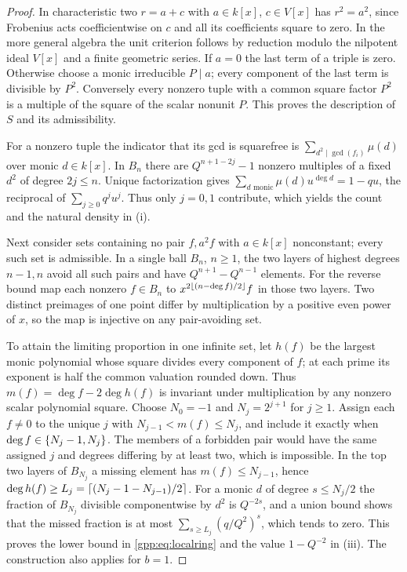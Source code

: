 \begin{proof}
In characteristic two $r=a+c$ with $a\in k[x]$, $c\in V[x]$ has $r^2=a^2$, since
Frobenius acts coefficientwise on $c$ and all its coefficients square to zero. In the
more general algebra the unit criterion follows by reduction modulo the nilpotent ideal
$V[x]$ and a finite geometric series. If $a=0$ the last term of a triple is zero.
Otherwise choose a monic irreducible $P\mid a$; every component of the last term is
divisible by $P^2$. Conversely every nonzero tuple with a common square factor $P^2$ is a
multiple of the square of the scalar nonunit $P$. This proves the description of $S$ and
its admissibility.

For a nonzero tuple the indicator that its gcd is squarefree is
$\sum_{d^2\mid\gcd(f_i)}\mu(d)$ over monic $d\in k[x]$. In $B_n$ there are
$Q^{n+1-2j}-1$ nonzero multiples of a fixed $d^2$ of degree $2j\le n$. Unique
factorization gives $\sum_{d\text{ monic}}\mu(d)u^{\deg d}=1-qu$, the reciprocal of
$\sum_{j\ge0}q^ju^j$. Thus only $j=0,1$ contribute, which yields the count and the
natural density in (i).

Next consider sets containing no pair $f,a^2f$ with $a\in k[x]$ nonconstant; every such
set is admissible. In a single ball $B_n$, $n\ge1$, the two layers of highest degrees
$n-1,n$ avoid all such pairs and have $Q^{n+1}-Q^{n-1}$ elements. For the reverse bound
map each nonzero $f\in B_n$ to $x^{2\lfloor(n-\deg f)/2\rfloor}f$ in those two layers. Two
distinct preimages of one point differ by multiplication by a positive even power of
$x$, so the map is injective on any pair-avoiding set.

To attain the limiting proportion in one infinite set, let $h(f)$ be the largest monic
polynomial whose square divides every component of $f$; at each prime its exponent is
half the common valuation rounded down. Thus $m(f)=\deg f-2\deg h(f)$ is invariant under
multiplication by any nonzero scalar polynomial square. Choose $N_0=-1$ and $N_j=2^{j+1}$
for $j\ge1$. Assign each $f\ne0$ to the unique $j$ with $N_{j-1}<m(f)\le N_j$, and
include it exactly when $\deg f\in\{N_j-1,N_j\}$. The members of a forbidden pair would
have the same assigned $j$ and degrees differing by at least two, which is impossible. In
the top two layers of $B_{N_j}$ a missing element has $m(f)\le N_{j-1}$, hence
$\deg h(f)\ge L_j=\lceil(N_j-1-N_{j-1})/2\rceil$. For a monic $d$ of degree $s\le N_j/2$ the
fraction of $B_{N_j}$ divisible componentwise by $d^2$ is $Q^{-2s}$, and a union bound
shows that the missed fraction is at most $\sum_{s\ge L_j}(q/Q^2)^s$, which tends to
zero. This proves the lower bound in \eqref{gpp:eq:localring} and the value $1-Q^{-2}$
in (iii). The construction also applies for $b=1$.


\end{proof}
